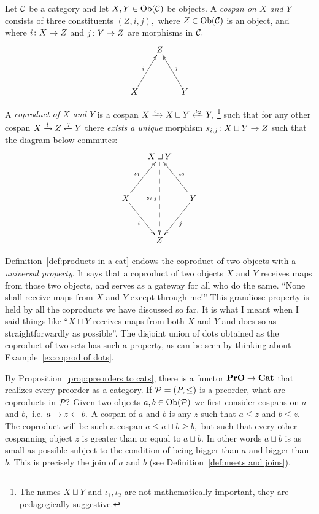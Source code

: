 \documentclass[CT4S-EN-RU]{subfiles}
\begin{document}
\begin{definitionENG}\label{def:coproducts in a cat}
Let $\mathcal{C}$ be a category and let $X,Y\in\textnormal{Ob}(\mathcal{C})$ be objects. A {\em cospan on $X$ and $Y$} consists of three constituents $(Z,i,j),$ where $Z\in\textnormal{Ob}(\mathcal{C})$ is an object, and where $i\colon X\rightarrow Z$ and $j\colon Y\rightarrow Z$ are morphisms in $\mathcal{C}.$ 
$$\xymatrix@=15pt{&Z\\\\X\ar[ruu]^i&&Y\ar[luu]_j}$$   

A {\em coproduct of $X$ and $Y$} is a cospan $X\xrightarrow{\iota_1}X\sqcup Y\xleftarrow{\iota_2}Y,$ \footnote{The names $X\sqcup Y$ and $\iota_1,\iota_2$ are not mathematically important, they are pedagogically suggestive.} such that for any other cospan $X\xrightarrow{i}Z\xleftarrow{j}Y$ there {\em exists a unique} morphism $s_{i,j}\colon X\sqcup Y\rightarrow Z$ such that the diagram below commutes:
$$
\xymatrix@=15pt{&X\sqcup Y\ar@{-->}[dddd]_{s_{i,j}}\\\\X\ar[uur]^{\iota_1}\ar[ddr]_i&&Y\ar[uul]_{\iota_2}\ar[ddl]^j\\\\&Z}
$$
\end{definitionENG}

\begin{definitionRUS}\label{def:coproducts in a cat}
\end{definitionRUS}

\begin{remarkENG}
Definition~\ref{def:products in a cat} endows the coproduct of two objects with a {\em universal property}. It says that a coproduct of two objects $X$ and $Y$ receives maps from those two objects, and serves as a gateway for all who do the same. “None shall receive maps from $X$ and $Y$ except through me!” This grandiose property is held by all the coproducts we have discussed so far. It is what I meant when I said things like “$X\sqcup Y$ receives maps from both $X$ and $Y$ and does so as straightforwardly as possible”.  The disjoint union of dots obtained as the coproduct of two sets has such a property, as can be seen by thinking about Example~\ref{ex:coprod of dots}.
\end{remarkENG}

\begin{remarkRUS}
\end{remarkRUS}

\begin{exampleENG}
By Proposition~\ref{prop:preorders to cats}, there is a functor ${\mathbf{PrO}}\rightarrow{\mathbf{Cat}}$ that realizes every preorder as a category. If $\mathcal{P}=(P,\leq)$ is a preorder, what are coproducts in $\mathcal{P}?$ Given two objects $a,b\in\textnormal{Ob}(\mathcal{P})$ we first consider cospans on $a$ and $b,$ i.e. $a\rightarrow z\leftarrow b.$ A cospan of $a$ and $b$ is any $z$ such that $a\leq z$ and $b\leq z.$ The coproduct will be such a cospan $a\leq a\sqcup b\geq b,$ but such that every other cospanning object $z$ is greater than or equal to $a\sqcup b.$ In other words $a\sqcup b$ is as small as possible subject to the condition of being bigger than $a$ and bigger than $b.$ This is precisely the join of $a$ and $b$ (see Definition~\ref{def:meets and joins}).
\end{exampleENG}
\end{document}

